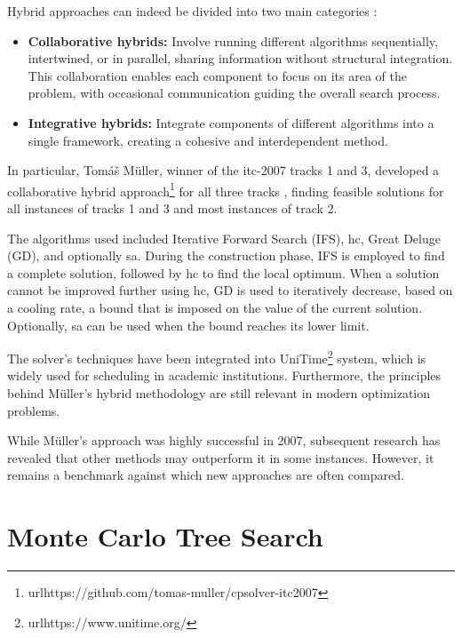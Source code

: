 Hybrid approaches can indeed be divided into two main categories \cite{abdipoor_meta-heuristic_2023}:

\begin{itemize}
\item \textbf{Collaborative hybrids:} Involve running different algorithms sequentially, intertwined, or in parallel, sharing information without structural integration. This collaboration enables each component to focus on its area of the problem, with occasional communication guiding the overall search process.

\item \textbf{Integrative hybrids:} Integrate components of different algorithms into a single framework, creating a cohesive and interdependent method.

\end{itemize}


In particular, Tomáš Müller, winner of the \ac{itc-2007} tracks 1 and 3, developed a collaborative hybrid approach\footnote{url{https://github.com/tomas-muller/cpsolver-itc2007}} for all three tracks \cite{muller_itc2007}, finding feasible solutions for all instances of tracks 1 and 3 and most instances of track 2. 

The algorithms used included Iterative Forward Search (IFS), \ac{hc}, Great Deluge (GD), and optionally \ac{sa}. During the construction phase, IFS is employed to find a complete solution, followed by \ac{hc} to find the local optimum. When a solution cannot be improved further using \ac{hc}, GD is used to iteratively decrease, based on a cooling rate, a bound that is imposed on the value of the current solution. Optionally, \ac{sa} can be used when the bound reaches its lower limit.

The solver's techniques have been integrated into UniTime\footnote{url{https://www.unitime.org/}} system, which is widely used for scheduling in academic institutions. Furthermore, the principles behind Müller's hybrid methodology are still relevant in modern optimization problems.

While Müller's approach was highly successful in 2007, subsequent research has revealed that other methods may outperform it in some instances. However, it remains a benchmark against which new approaches are often compared.

\section{Monte Carlo Tree Search}

